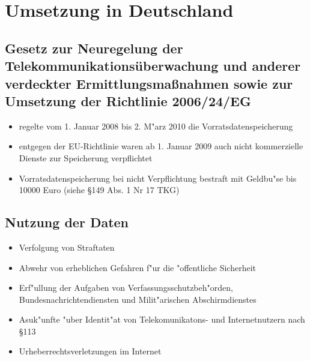 
\section{Umsetzung in Deutschland}
  \subsection{Gesetz zur Neuregelung der Telekommunikationsüberwachung und anderer verdeckter Ermittlungsmaßnahmen sowie zur Umsetzung der Richtlinie 2006/24/EG}
    \begin{frame}
      \begin{itemize}
        \item 
          regelte vom 1. Januar 2008 bis 2. M"arz 2010 die Vorratsdatenspeicherung
        \item 
          entgegen der EU-Richtlinie waren ab 1. Januar 2009 auch nicht kommerzielle Dienste zur Speicherung verpflichtet
        \item 
          Vorratsdatenspeicherung bei nicht Verpflichtung bestraft mit Geldbu"se bis 10000 Euro (siehe \S 149 Abs. 1 Nr 17 TKG)
      \end{itemize}
    \end{frame}

  \subsection{Nutzung der Daten}
    \begin{frame}
      \begin{itemize}
        \item Verfolgung von Straftaten
        \item Abwehr von erheblichen Gefahren f"ur die "offentliche Sicherheit
        \item Erf"ullung der Aufgaben von Verfassungsschutzbeh"orden, Bundesnachrichtendiensten und Milit"arischen Abschirmdienstes
        \item Asuk"unfte "uber Identit"at von Telekomunikatons- und Internetnutzern nach \S 113
        \item Urheberrechtsverletzungen im Internet
      \end{itemize}
    \end{frame}

